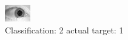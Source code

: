 \begin{figure}[h!]
\begin{center}
\includegraphics[width=0.60\columnwidth]{figures/ID1491_class_2_target_1.png}
\end{center}
\caption{ Classification: 2 actual target: 1}
\label{fig:ID1491_class_2_target_1}
\end{figure}
